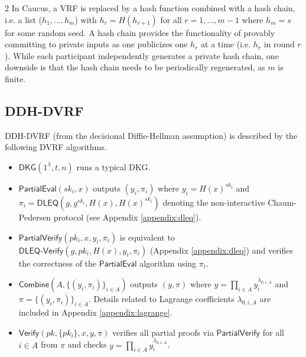 \documentclass[conference]{IEEEtran}
\theoremstyle{definition}
\theoremstyle{remark}
\begin{document}
\begin{table*}[h!]
\begin{threeparttable}
\begin{tablenotes}[flushleft]
\item[2] In Caucus, a VRF is replaced by a hash function combined with a hash chain, i.e. a list ($h_1, ..., h_m$) with $h_r = H(h_{r + 1})$ for all $r = 1, ..., m - 1$ where $h_m = s$ for some random seed. A hash chain provides the functionality of provably committing to private inputs as one publicizes one $h_r$ at a time (i.e. $h_r$ in round $r$). While each participant independently generates a private hash chain, one downside is that the hash chain needs to be periodically regenerated, as $m$ is finite.
\end{tablenotes}
\end{threeparttable}
\end{table*}

\subsection{DDH-DVRF}
\label{appendix:ddh-dvrf}
DDH-DVRF (from the decisional Diffie-Hellman assumption) is described by the following DVRF algorithms.
\begin{itemize}
\item $\mathsf{DKG}(1^\lambda, t, n)$ runs a typical DKG.
\item $\mathsf{PartialEval}(sk_i, x)$ outputs $(y_i, \pi_i)$ where $y_i = H(x)^{sk_i}$ and $\pi_i = \mathsf{DLEQ}(g, g^{sk_i}, H(x), H(x)^{sk_i})$ denoting the non-interactive Chaum-Pedersen protocol (see Appendix \ref{appendix:dleq}).
\item $\mathsf{PartialVerify}(pk_i, x, y_i, \pi_i)$ is equivalent to $\mathsf{DLEQ}\text{-}\mathsf{Verify}(g, pk_i, H(x), y_i, \pi_i)$ (Appendix \ref{appendix:dleq}) and verifies the correctness of the $\mathsf{PartialEval}$ algorithm using $\pi_i$.
\item $\mathsf{Combine}(A, \{(y_i, \pi_i)\}_{i \in A})$ outputs $(y, \pi)$ where $y = \prod_{i \in A} y_i^{\lambda_{0, i, A}}$ and $\pi = \{(y_i, \pi_i)\}_{i \in A}$. Details related to Lagrange coefficients $\lambda_{0, i, A}$ are included in Appendix \ref{appendix:lagrange}.
\item $\mathsf{Verify}(pk, \{pk_i\}, x, y, \pi)$ verifies all partial proofs via $\mathsf{PartialVerify}$ for all $i \in A$ from $\pi$ and checks $y = \prod_{i \in A} y_i^{\lambda_{0, i, A}}$.
\end{itemize}
\end{document}
